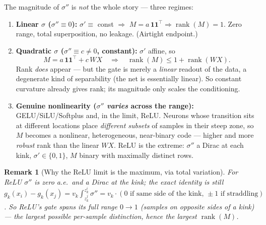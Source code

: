 \documentclass[11pt]{article}
\newtheorem{remark}{Remark}
\newcommand{\rank}{\operatorname{rank}}
\begin{document}
\noindent The magnitude of $\sigma''$ is \emph{not} the whole story --- three regimes:
\begin{enumerate}
  \item[(i)] \textbf{Linear $\sigma$ ($\sigma''\equiv0$):} $\sigma'\equiv$ const $\Rightarrow$
  $M=a\,\bm1\bm1^\top\Rightarrow\rank(M)=1$. Zero range, total superposition, no leakage. (Airtight endpoint.)
  \item[(ii)] \textbf{Quadratic $\sigma$ ($\sigma''\equiv c\neq0$, constant):} $\sigma'$ affine, so
  \begin{equation}
    M=a\,\bm1\bm1^\top+c\,WX\quad\Rightarrow\quad \rank(M)\le 1+\rank(WX).
  \end{equation}
  Rank \emph{does} appear --- but the gate is merely a \emph{linear} readout of the data, a degenerate
  kind of separability (the net is essentially linear). So constant curvature already gives rank; its
  magnitude only scales the conditioning.
  \item[(iii)] \textbf{Genuine nonlinearity ($\sigma''$ \emph{varies} across the range):} GELU/SiLU/Softplus
  and, in the limit, ReLU. Neurons whose transition sits at different locations place \emph{different
  subsets} of samples in their steep zone, so $M$ becomes a nonlinear, heterogeneous, near-binary code
  --- higher and more \emph{robust} rank than the linear $WX$. ReLU is the extreme: $\sigma''$ a Dirac at
  each kink, $\sigma'\in\{0,1\}$, $M$ binary with maximally distinct rows.
\end{enumerate}

\begin{remark}[Why the ReLU limit is the maximum, via total variation]
For ReLU $\sigma''$ is zero a.e.\ and a Dirac at the kink; the exact identity is still
$g_k(x_i)-g_k(x_j)=v_k\!\int_{z_k^j}^{z_k^i}\sigma''=v_k\cdot(\text{0 if same side of the kink, }\pm1\text{ if straddling})$.
So ReLU's gate spans its \emph{full} range $0\!\to\!1$ (samples on opposite sides of a kink) --- the
largest possible per-sample distinction, hence the largest $\rank(M)$.
\end{remark}
\end{document}
